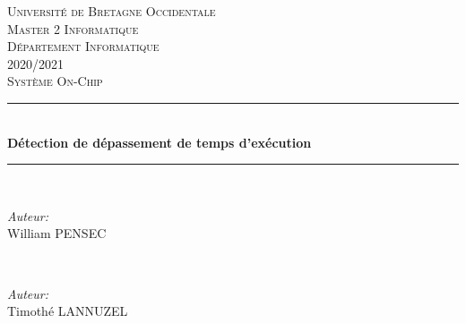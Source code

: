 \documentclass[a4paper,12pt]{report}
\begin{document}
   \begin{titlepage}
    
    \newcommand{\HRule}{\rule{\linewidth}{0.5mm}} %
    
    \center %
     
    
    \textsc{\LARGE Université de Bretagne Occidentale}\\[1.5cm] %
		\textsc{\Large Master 2 Informatique}\\[0.5cm] %
		\textsc{\Large Département Informatique}\\[1.5cm] %
		{\large 2020/2021}\\[1.5cm] %
		
    \textsc{\large Système On-Chip}\\[1cm] %
    
    
   \HRule \\[0.4cm]
    { \huge \bfseries Détection de dépassement de temps d'exécution}\\[0.2cm] %
    \HRule \\[1cm]
     
    
    \begin{minipage}{0.48\textwidth}
			\begin{flushleft} \large
				\emph{Auteur:}\\
					William \textsc{PENSEC} %
			\end{flushleft}
    \end{minipage}
		~
		\begin{minipage}{0.48\textwidth}
			\begin{flushright} \large
				\emph{Auteur:}\\
					Timothé \textsc{LANNUZEL} %
			\end{flushright}
    \end{minipage}\\[1.5cm]
    

\end{titlepage}
\end{document}
